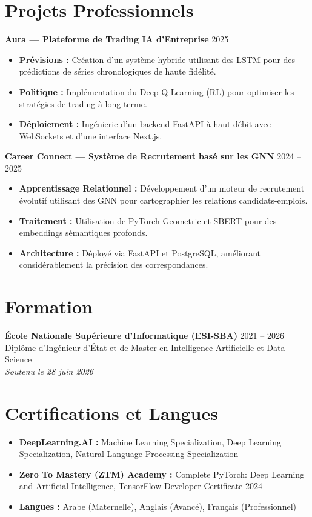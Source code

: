 \documentclass[a4paper,10pt]{article}
\begin{document}
\section{Projets Professionnels}
\noindent\textbf{Aura --- Plateforme de Trading IA d'Entreprise} \hfill 2025 \\
\begin{itemize}
    \item \textbf{Prévisions :} Création d'un système hybride utilisant des LSTM pour des prédictions de séries chronologiques de haute fidélité.
    \item \textbf{Politique :} Implémentation du Deep Q-Learning (RL) pour optimiser les stratégies de trading à long terme.
    \item \textbf{Déploiement :} Ingénierie d'un backend FastAPI à haut débit avec WebSockets et d'une interface Next.js.
\end{itemize}

\vspace{6pt}
\noindent\textbf{Career Connect --- Système de Recrutement basé sur les GNN} \hfill 2024 -- 2025 \\
\begin{itemize}
    \item \textbf{Apprentissage Relationnel :} Développement d'un moteur de recrutement évolutif utilisant des GNN pour cartographier les relations candidats-emplois.
    \item \textbf{Traitement :} Utilisation de PyTorch Geometric et SBERT pour des embeddings sémantiques profonds.
    \item \textbf{Architecture :} Déployé via FastAPI et PostgreSQL, améliorant considérablement la précision des correspondances.
\end{itemize}

\section{Formation}
\textbf{École Nationale Supérieure d'Informatique (ESI-SBA)} \hfill 2021 -- 2026 \\
Diplôme d'Ingénieur d'État et de Master en Intelligence Artificielle et Data Science \\
\textit{Soutenu le 28 juin 2026}

\section{Certifications et Langues}
\begin{itemize}[label=--]
    \item \textbf{DeepLearning.AI :} Machine Learning Specialization, Deep Learning Specialization, Natural Language Processing Specialization
    \item \textbf{Zero To Mastery (ZTM) Academy :} Complete PyTorch: Deep Learning and Artificial Intelligence, TensorFlow Developer Certificate 2024
    \item \textbf{Langues :} Arabe (Maternelle), Anglais (Avancé), Français (Professionnel)
\end{itemize}
\end{document}
